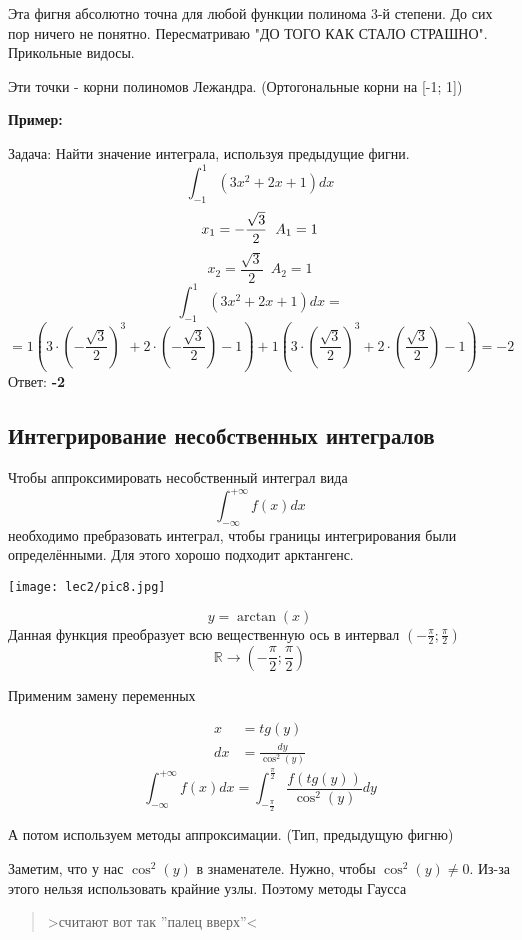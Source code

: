 \documentclass[12pt]{article}
\begin{document}
\begin{itemize}
\begin{itemize}
        Эта фигня абсолютно точна для любой функции полинома 3-й степени.
        До сих пор ничего не понятно. Пересматриваю "ДО ТОГО КАК СТАЛО СТРАШНО".
        Прикольные видосы.

        Эти точки - корни полиномов Лежандра. (Ортогональные корни на [-1; 1])

        \newpage
        \textbf{Пример:}

        Задача: Найти значение интеграла, используя предыдущие фигни.
        \[
          \int_{-1}^{1} (3x^2+2x+1)dx
        \] 
        \[
          x_{1} = - \frac{\sqrt{3}}{2} \hspace{6pt} A_{1} = 1 \\
        \]
        \[
          x_{2} = \frac{\sqrt{3}}{2} \hspace{6pt} A_{2} = 1
        \] 
        \[
          \int_{-1}^{1} (3x^2+2x+1)dx =
        \] 
        \[
          = 1 \left( 3 \cdot \left( -\frac{\sqrt{3}}{2} \right)^3 +
          2 \cdot \left( -\frac{\sqrt{3}}{2} \right) - 1\right) +
          1 \left( 3 \cdot \left( \frac{\sqrt{3}}{2} \right)^3 +
          2 \cdot \left(\frac{\sqrt{3}}{2} \right) - 1\right) = -2
        \] 
        Ответ: \textbf{-2}
    \end{itemize}
\end{itemize}
\subsection{Интегрирование несобственных интегралов}

Чтобы аппроксимировать несобственный интеграл вида
\[
  \int_{-\infty}^{+\infty} f(x)dx
\] 
необходимо пребразовать интеграл, чтобы границы интегрирования были
определёнными. Для этого хорошо подходит арктангенс.
\begin{center}
	\texttt{[image: lec2/pic8.jpg]}
\end{center}
\[
  y = \arctan(x)
\] 
Данная функция преобразует всю вещественную ось
в интервал \( \left( -\frac{\pi}{2}; \frac{\pi}{2} \right) \)
\[
  \mathbb{R} \to \left( -\frac{\pi}{2}; \frac{\pi}{2} \right)
\] 

Применим замену переменных

\begin{align*}
  x &= tg(y) \\
  dx &= \frac{dy}{\cos^2(y)}
\end{align*}
\[
  \displaystyle\int_{-\infty}^{+\infty} f(x)dx =
  \int_{-\frac{\pi}{2}}^{\frac{\pi}{2}} \frac{f(tg(y))}{\cos^2(y)}dy
\] 

А потом используем методы аппроксимации. (Тип, предыдущую фигню)

Заметим, что у нас \( \cos^2(y) \) в знаменателе.
Нужно, чтобы \( \cos^2(y) \neq 0 \). Из-за этого нельзя использовать крайние узлы.
Поэтому методы Гаусса

\begin{quotation}
  \centering
  >считают вот так ''палец вверх''<
\end{quotation}

\end{document}
